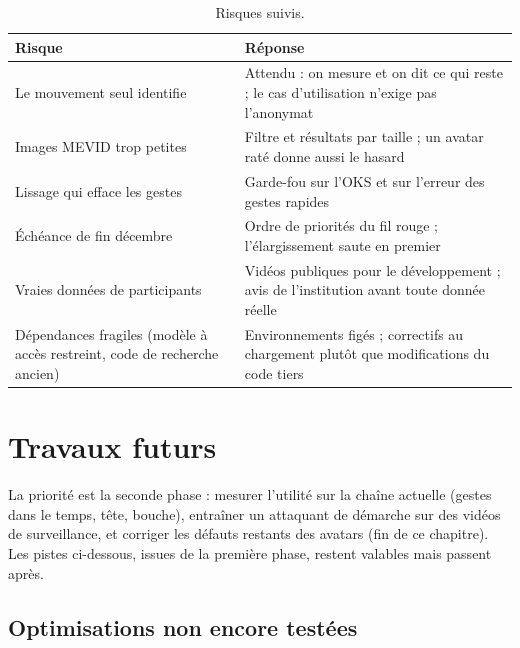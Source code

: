 \documentclass[11pt,a4paper]{report}
\begin{document}
\begin{table}[H]
\centering
\caption{Risques suivis.}
\label{tab:risks}
\small
\begin{tabularx}{\textwidth}{@{}>{\raggedright\arraybackslash}p{4.2cm}Y@{}}
\toprule
Risque & Réponse \\
\midrule
Le mouvement seul identifie & Attendu : on mesure et on dit ce qui reste ; le cas d'utilisation n'exige pas l'anonymat \\
Images MEVID trop petites & Filtre et résultats par taille ; un avatar raté donne aussi le hasard \\
Lissage qui efface les gestes & Garde-fou sur l'OKS et sur l'erreur des gestes rapides \\
Échéance de fin décembre & Ordre de priorités du fil rouge ; l'élargissement saute en premier \\
Vraies données de participants & Vidéos publiques pour le développement ; avis de l'institution avant toute donnée réelle \\
Dépendances fragiles (modèle à accès restreint, code de recherche ancien) & Environnements figés ; correctifs au chargement plutôt que modifications du code tiers \\
\bottomrule
\end{tabularx}
\end{table}

\chapter{Travaux futurs}
\label{chap:futur}

La priorité est la seconde phase : mesurer l'utilité sur la chaîne actuelle (gestes dans le temps, tête, bouche), entraîner un attaquant
de démarche sur des vidéos de surveillance, et corriger les défauts restants des avatars (fin de ce chapitre). Les pistes
ci-dessous, issues de la première phase, restent valables mais passent après.

\section{Optimisations non encore testées}
\end{document}
